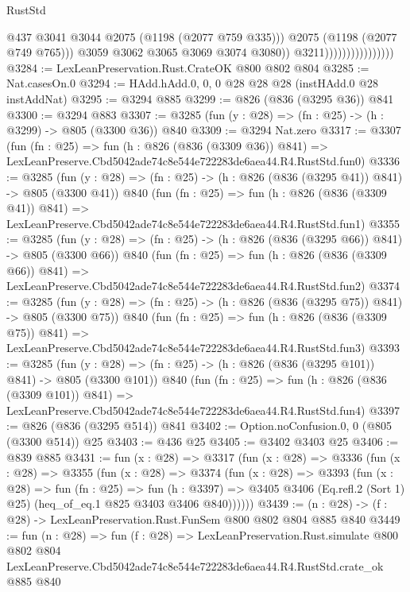\begin{lexlean}{RustStd}
\begin{coremodule}
                                            @437
                                            @3041
                                            @3044
                                            @2075
                                            (@1198 (@2077 @759 @335)))
                                          @2075
                                          (@1198 (@2077 @749 @765)))
                                        @3059
                                        @3062
                                        @3065
                                        @3069
                                        @3074
                                        @3080))
                                    @3211))))))))))))))))
@3284 := LexLeanPreservation.Rust.CrateOK @800 @802 @804
@3285 := Nat.casesOn.{0}
@3294 := HAdd.hAdd.{0, 0, 0} @28 @28 @28 (instHAdd.{0} @28 instAddNat)
@3295 := @3294 @885
@3299 := @826 (@836 (@3295 @36)) @841
@3300 := @3294 @883
@3307 := @3285 (fun (y : @28) => (fn : @25) -> (h : @3299) -> @805 (@3300 @36)) @840
@3309 := @3294 Nat.zero
@3317 := @3307
    (fun (fn : @25) =>
    fun (h : @826 (@836 (@3309 @36)) @841) =>
    LexLeanPreserve.Cbd5042ade74c8e544e722283de6aea44.R4.RustStd.fun0)
@3336 := @3285
    (fun (y : @28) => (fn : @25) -> (h : @826 (@836 (@3295 @41)) @841) -> @805 (@3300 @41))
    @840
    (fun (fn : @25) =>
    fun (h : @826 (@836 (@3309 @41)) @841) =>
    LexLeanPreserve.Cbd5042ade74c8e544e722283de6aea44.R4.RustStd.fun1)
@3355 := @3285
    (fun (y : @28) => (fn : @25) -> (h : @826 (@836 (@3295 @66)) @841) -> @805 (@3300 @66))
    @840
    (fun (fn : @25) =>
    fun (h : @826 (@836 (@3309 @66)) @841) =>
    LexLeanPreserve.Cbd5042ade74c8e544e722283de6aea44.R4.RustStd.fun2)
@3374 := @3285
    (fun (y : @28) => (fn : @25) -> (h : @826 (@836 (@3295 @75)) @841) -> @805 (@3300 @75))
    @840
    (fun (fn : @25) =>
    fun (h : @826 (@836 (@3309 @75)) @841) =>
    LexLeanPreserve.Cbd5042ade74c8e544e722283de6aea44.R4.RustStd.fun3)
@3393 := @3285
    (fun (y : @28) => (fn : @25) -> (h : @826 (@836 (@3295 @101)) @841) -> @805 (@3300 @101))
    @840
    (fun (fn : @25) =>
    fun (h : @826 (@836 (@3309 @101)) @841) =>
    LexLeanPreserve.Cbd5042ade74c8e544e722283de6aea44.R4.RustStd.fun4)
@3397 := @826 (@836 (@3295 @514)) @841
@3402 := Option.noConfusion.{0, 0} (@805 (@3300 @514)) @25
@3403 := @436 @25
@3405 := @3402 @3403 @25
@3406 := @839 @885
@3431 := fun (x : @28) =>
  @3317
    (fun (x : @28) =>
    @3336
      (fun (x : @28) =>
      @3355
        (fun (x : @28) =>
        @3374
          (fun (x : @28) =>
          @3393
            (fun (x : @28) =>
            fun (fn : @25) =>
            fun (h : @3397) =>
            @3405 @3406 (Eq.refl.{2} (Sort 1) @25) (heq_of_eq.{1} @825 @3403 @3406 @840))))))
@3439 := (n : @28) -> (f : @28) -> LexLeanPreservation.Rust.FunSem @800 @802 @804 @885 @840
@3449 := fun (n : @28) =>
  fun (f : @28) =>
  LexLeanPreservation.Rust.simulate
    @800
    @802
    @804
    LexLeanPreserve.Cbd5042ade74c8e544e722283de6aea44.R4.RustStd.crate_ok
    @885
    @840
\end{coremodule}
\end{lexlean}
